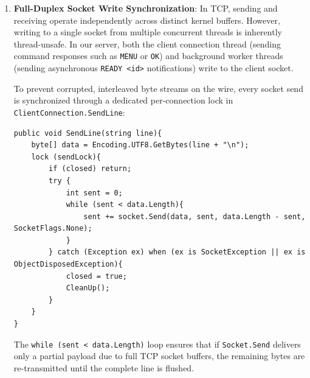 \documentclass[11pt,a4paper]{article}
\begin{document}
\begin{enumerate}
\begin{lstlisting}[language={[Sharp]C},caption={Atomic inventory verification in Shop.cs}]
        if (!stock.ContainsKey(product) || stock[product] < quantity){
            int left = stock.ContainsKey(product) ? stock[product] : 0;
            return new OrderResult{
                Accepted = false,
                MissingProduct = product,
                Left = left
            };
        }
    }

    // Phase 2: Atomic subtraction only after ALL items are guaranteed
    foreach (KeyValuePair<string, int> item in items){
        stock[item.Key] -= item.Value;
        totalSeconds += Products.PreparationSeconds(item.Key) * item.Value;
    }

    // Phase 3: Enqueue and signal waiting worker
    waitingOrders.Add(order);
    Monitor.Pulse(shopLock);
}
    \end{lstlisting}
    Because mutual exclusion is strictly enforced by \texttt{shopLock}, no other client or worker can observe or alter intermediate stock counts. If two clients request the last croissant at the exact same instant, their executions serialize on \texttt{shopLock}. The first thread verifies stock ($1 \ge 1$), decrements it to 0, and receives \texttt{Accepted = true}. When the second thread acquires the lock, stock is 0; it is immediately refused with \texttt{REFUSED croissant LEFT 0}.

    \item \textbf{Full-Duplex Socket Write Synchronization}:
    In TCP, sending and receiving operate independently across distinct kernel buffers. However, writing to a single socket from multiple concurrent threads is inherently thread-unsafe. In our server, both the client connection thread (sending command responses such as \texttt{MENU} or \texttt{OK}) and background worker threads (sending asynchronous \texttt{READY <id>} notifications) write to the client socket.
    
    To prevent corrupted, interleaved byte streams on the wire, every socket send is synchronized through a dedicated per-connection lock in \texttt{ClientConnection.SendLine}:
    \begin{lstlisting}[language={[Sharp]C}]
public void SendLine(string line){
    byte[] data = Encoding.UTF8.GetBytes(line + "\n");
    lock (sendLock){
        if (closed) return;
        try {
            int sent = 0;
            while (sent < data.Length){
                sent += socket.Send(data, sent, data.Length - sent, SocketFlags.None);
            }
        } catch (Exception ex) when (ex is SocketException || ex is ObjectDisposedException){
            closed = true;
            CleanUp();
        }
    }
}
    \end{lstlisting}
    The \texttt{while (sent < data.Length)} loop ensures that if \texttt{Socket.Send} delivers only a partial payload due to full TCP socket buffers, the remaining bytes are re-transmitted until the complete line is flushed.
\end{enumerate}
\end{document}
